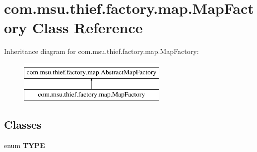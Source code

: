 \hypertarget{classcom_1_1msu_1_1thief_1_1factory_1_1map_1_1MapFactory}{\section{com.\-msu.\-thief.\-factory.\-map.\-Map\-Factory Class Reference}
\label{classcom_1_1msu_1_1thief_1_1factory_1_1map_1_1MapFactory}
}
Inheritance diagram for com.\-msu.\-thief.\-factory.\-map.\-Map\-Factory\-:\begin{figure}[H]
\begin{center}
\leavevmode
\includegraphics[height=2.000000cm]{classcom_1_1msu_1_1thief_1_1factory_1_1map_1_1MapFactory}
\end{center}
\end{figure}
\subsection*{Classes}
\begin{DoxyCompactItemize}
\item 
enum {\bfseries T\-Y\-P\-E}
\end{DoxyCompactItemize}
